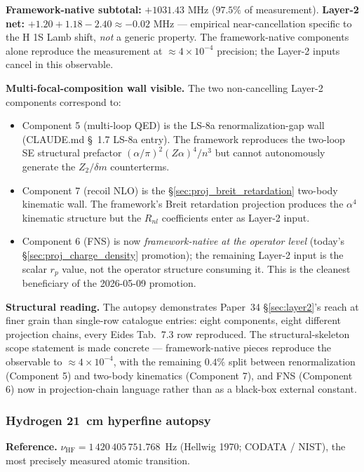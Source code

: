 \documentclass[11pt]{article}
\begin{document}
\textbf{Framework-native subtotal:} $+1031.43$ MHz ($97.5\%$ of
measurement).  \textbf{Layer-2 net:} $+1.20 + 1.18 - 2.40 \approx
-0.02$ MHz --- empirical near-cancellation specific to the H 1S
Lamb shift, \emph{not} a generic property.  The framework-native
components alone reproduce the measurement at $\approx 4 \times
10^{-4}$ precision; the Layer-2 inputs cancel in this observable.

\textbf{Multi-focal-composition wall visible.}  The two non-cancelling
Layer-2 components correspond to:
\begin{itemize}\setlength\itemsep{0pt}
\item Component 5 (multi-loop QED) is the LS-8a renormalization-gap
wall (CLAUDE.md \S~1.7 LS-8a entry).  The framework reproduces the
two-loop SE structural prefactor $(\alpha/\pi)^2 (Z\alpha)^4/n^3$
but cannot autonomously generate the $Z_2/\delta m$ counterterms.
\item Component 7 (recoil NLO) is the
\S\ref{sec:proj_breit_retardation} two-body kinematic wall.  The
framework's Breit retardation projection produces the $\alpha^4$
kinematic structure but the $R_{nl}$ coefficients enter as
Layer-2 input.
\item Component 6 (FNS) is now \emph{framework-native at the
operator level} (today's \S\ref{sec:proj_charge_density} promotion);
the remaining Layer-2 input is the scalar $r_p$ value, not the
operator structure consuming it.  This is the cleanest beneficiary
of the 2026-05-09 promotion.
\end{itemize}

\textbf{Structural reading.}  The autopsy demonstrates Paper~34
\S\ref{sec:layer2}'s reach at finer grain than single-row catalogue
entries: eight components, eight different projection chains, every
Eides Tab.~7.3 row reproduced.  The structural-skeleton scope
statement is made concrete --- framework-native pieces reproduce the
observable to $\approx 4 \times 10^{-4}$, with the remaining $0.4\%$
split between renormalization (Component 5) and two-body kinematics
(Component 7), and FNS (Component 6) now in projection-chain language
rather than as a black-box external constant.

\subsubsection{Hydrogen 21~cm hyperfine autopsy}
\label{sec:autopsy_21cm}

\textbf{Reference.} $\nu_\text{HF} = 1\,420\,405\,751.768$~Hz (Hellwig
1970; CODATA / NIST), the most precisely measured atomic transition.
\end{document}
